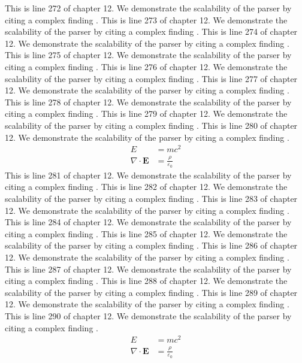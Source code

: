 This is line 272 of chapter 12. We demonstrate the scalability of the parser by citing a complex finding \cite{ref12_272}.
This is line 273 of chapter 12. We demonstrate the scalability of the parser by citing a complex finding \cite{ref12_273}.
This is line 274 of chapter 12. We demonstrate the scalability of the parser by citing a complex finding \cite{ref12_274}.
This is line 275 of chapter 12. We demonstrate the scalability of the parser by citing a complex finding \cite{ref12_275}.
This is line 276 of chapter 12. We demonstrate the scalability of the parser by citing a complex finding \cite{ref12_276}.
This is line 277 of chapter 12. We demonstrate the scalability of the parser by citing a complex finding \cite{ref12_277}.
This is line 278 of chapter 12. We demonstrate the scalability of the parser by citing a complex finding \cite{ref12_278}.
This is line 279 of chapter 12. We demonstrate the scalability of the parser by citing a complex finding \cite{ref12_279}.
This is line 280 of chapter 12. We demonstrate the scalability of the parser by citing a complex finding \cite{ref12_280}.
\begin{align*}
  E &= mc^2 \\
  \nabla \cdot \mathbf{E} &= \frac{\rho}{\varepsilon_0}
\end{align*}
This is line 281 of chapter 12. We demonstrate the scalability of the parser by citing a complex finding \cite{ref12_281}.
This is line 282 of chapter 12. We demonstrate the scalability of the parser by citing a complex finding \cite{ref12_282}.
This is line 283 of chapter 12. We demonstrate the scalability of the parser by citing a complex finding \cite{ref12_283}.
This is line 284 of chapter 12. We demonstrate the scalability of the parser by citing a complex finding \cite{ref12_284}.
This is line 285 of chapter 12. We demonstrate the scalability of the parser by citing a complex finding \cite{ref12_285}.
This is line 286 of chapter 12. We demonstrate the scalability of the parser by citing a complex finding \cite{ref12_286}.
This is line 287 of chapter 12. We demonstrate the scalability of the parser by citing a complex finding \cite{ref12_287}.
This is line 288 of chapter 12. We demonstrate the scalability of the parser by citing a complex finding \cite{ref12_288}.
This is line 289 of chapter 12. We demonstrate the scalability of the parser by citing a complex finding \cite{ref12_289}.
This is line 290 of chapter 12. We demonstrate the scalability of the parser by citing a complex finding \cite{ref12_290}.
\begin{align*}
  E &= mc^2 \\
  \nabla \cdot \mathbf{E} &= \frac{\rho}{\varepsilon_0}
\end{align*}
